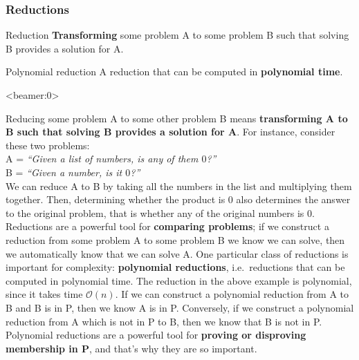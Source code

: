 \documentclass[handout, 12pt]{beamer}
\newcommand{\bigo}[1]{\mathcal{O}\mathopen{}\left(#1\right)\mathclose{}}
\begin{document}
\begin{frame}

\frametitle{Reductions}

\pause
\begin{block}{Reduction}
\textbf{Transforming} some problem A to some problem B such that solving B provides a solution for A.
\end{block}

\pause
\vspace{2em}
\begin{block}{Polynomial reduction}
A reduction that can be computed in \textbf{polynomial time}.
\end{block}

\end{frame}

\begin{frame}<beamer:0>

\footnotesize
Reducing some problem A to some other problem B means \textbf{transforming A to B such that solving B provides a solution for A}. For instance, consider these two problems:
\\[0.6em]
A = \textit{``Given a list of numbers, is any of them $0$?''}
\\[0.6em]
B = \textit{``Given a number, is it $0$?''}
\\[0.6em]
We can reduce A to B by taking all the numbers in the list and multiplying them together. Then, determining whether the product is $0$ also determines the answer to the original problem, that is whether any of the original numbers is $0$.
\\[0.6em]
Reductions are a powerful tool for \textbf{comparing problems}; if we construct a reduction from some problem A to some problem B we know we can solve, then we automatically know that we can solve A. One particular class of reductions is important for complexity: \textbf{polynomial reductions}, i.e.~reductions that can be computed in polynomial time. The reduction in the above example is polynomial, since it takes time $\bigo{n}$. If we can construct a polynomial reduction from A to B and B is in P, then we know A is in P. Conversely, if we construct a polynomial reduction from A which is not in P to B, then we know that B is not in P. Polynomial reductions are a powerful tool for \textbf{proving or disproving membership in P}, and that's why they are so important.

\end{frame}
\end{document}
